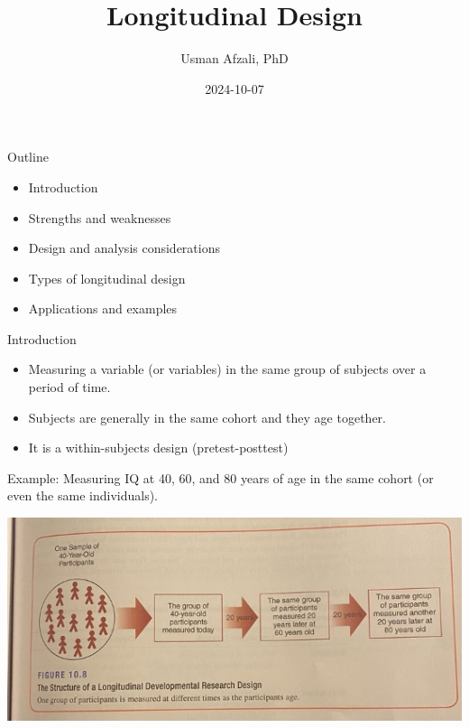 \documentclass[
  ignorenonframetext,
  aspectratio=169,
]{beamer}
\title{Longitudinal Design}
\author{Usman Afzali, PhD}
\date{2024-10-07}
\providecommand{\tightlist}{%
  \setlength{\itemsep}{0pt}\setlength{\parskip}{0pt}}\usepackage{longtable,booktabs,array}
\begin{document}
\frame{\titlepage}

\begin{frame}{Outline}
\label{outline}
\begin{itemize}
\tightlist
\item
  Introduction
\item
  Strengths and weaknesses
\item
  Design and analysis considerations
\item
  Types of longitudinal design
\item
  Applications and examples
\end{itemize}
\end{frame}

\begin{frame}{Introduction}
\label{introduction}
\begin{itemize}[<+->]
\tightlist
\item
  Measuring a variable (or variables) in the same group of subjects over
  a period of time.
\item
  Subjects are generally in the same cohort and they age together.
\item
  It is a within-subjects design (pretest-posttest)
\end{itemize}
\end{frame}

\begin{frame}
Example: Measuring IQ at 40, 60, and 80 years of age in the same cohort
(or even the same individuals).

\begin{center}
\includegraphics{figs/iq.jpg}
\end{center}
\end{frame}
\end{document}
